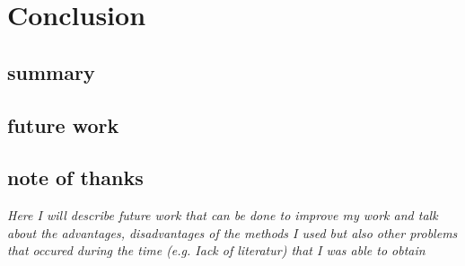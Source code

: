 \chapter{Conclusion}

\section{summary}
\section{future work}
\section{note of thanks}
\textit{Here I will describe future work that can be done to improve my work and talk about the advantages, disadvantages of the methods I used but also other problems that occured during the time (e.g. Iack of literatur) that I was able to obtain}